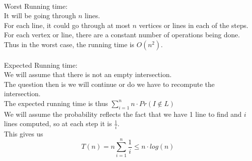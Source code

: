 \documentclass[11pt,psfig]{article}
\begin{document}
\\
Worst Running time:\\
It will be going through $n$ lines. \\
For each line, it could go through at most $n$ vertices or lines in each of the steps. \\
For each vertex or line, there are a constant number of operations being done. \\
Thus in the worst case, the running time is $O(n^2)$. \\
\\
Expected Running time:\\
We will assume that there is not an empty intersection. \\
The question then is we will continue or do we have to recompute the intersection. \\
The expected running time is thus $\sum_{i=1}^n n \cdot Pr(I \notin L)$\\
We will assume the probability reflects the fact that we have 1 line to find and $i$ lines computed, so at each step it is $\frac{1}{i}$. \\
This gives us 
\[
T(n) = n \sum_{i=1}^n \frac{1}{i} \leq n \cdot log(n)
\]
\end{document}
